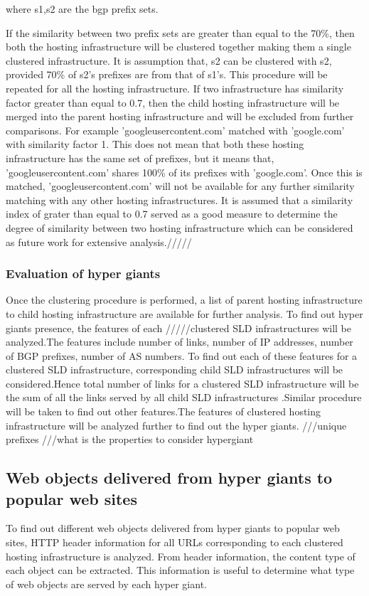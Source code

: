 where s1,s2 are the bgp prefix sets.

If the similarity between two prefix sets are greater than equal to the 70\%, then both the hosting infrastructure will be clustered together making them a single clustered infrastructure. It is assumption that, s2 can be clustered with s2, provided 70\% of s2's prefixes are from that of s1's. This procedure will be repeated for all the hosting infrastructure. If two infrastructure has similarity factor greater than equal to 0.7, then the child hosting infrastructure will be merged into the parent hosting infrastructure and will be excluded from further comparisons. For example ’googleusercontent.com’ matched with ’google.com’ with similarity factor 1. This does not mean that both these hosting infrastructure has the same set of prefixes, but it means that, ’googleusercontent.com’ shares 100\% of its prefixes with ’google.com’. Once this is matched, ’googleusercontent.com’ will not be available for any further similarity matching with any other hosting infrastructures. It is assumed that a similarity index of grater than equal to 0.7 served as a good measure to determine the degree of similarity between two hosting infrastructure which can be considered as future work for extensive analysis./////

\subsubsection{Evaluation of hyper giants}
Once the clustering procedure is performed, a list of parent hosting infrastructure to child hosting infrastructure are available for further analysis. To find out hyper giants presence, the features of each /////clustered SLD infrastructures will be analyzed.The features include number of links, number of IP addresses, number of BGP prefixes, number of AS numbers. To find out each of these features for a  clustered SLD infrastructure, corresponding child SLD infrastructures  will be considered.Hence total number of links for a clustered SLD infrastructure will be the sum of all the links served by all child SLD infrastructures .Similar procedure will be taken to find out other features.The features of clustered hosting infrastructure will be analyzed further to find out the hyper giants.  ///unique prefixes
///what is the properties to consider hypergiant
\subsection{Web objects delivered from hyper giants to popular web sites}
To find out different web objects delivered from hyper giants to popular web sites, HTTP header information for all URLs corresponding to each clustered hosting infrastructure is analyzed. From header information, the content type of each object can be extracted. This information is useful to determine what type of web objects are served by each hyper giant.
